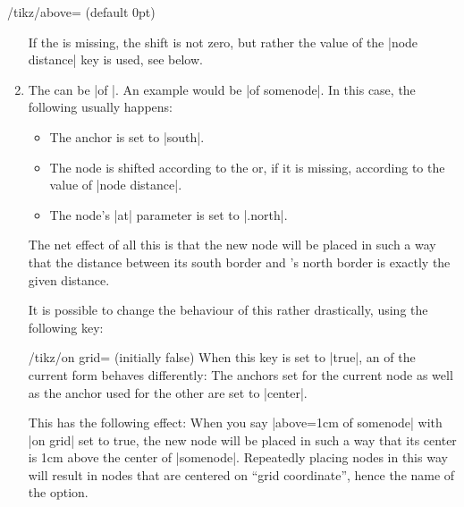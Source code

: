 \begin{key}{/tikz/above= (default 0pt)}
\begin{enumerate}
            If the  is missing, the shift is not zero, but
            rather the value of the |node distance| key is used, see below.
        \item The  can be |of |. An example would
            be |of somenode|. In this case, the following usually happens:
            \begin{itemize}
                \item The anchor is set to |south|.
                \item The node is shifted according to the 
                    or, if it is missing, according to the value of
                    |node distance|.
                \item The node's |at| parameter is set to |.north|.
            \end{itemize}
            The net effect of all this is that the new node will be placed in
            such a way that the distance between its south border and 's north border is exactly the given distance.
\begin{codeexample}[preamble={\usetikzlibrary{positioning}}]
\end{codeexample}
            It is possible to change the behaviour of this 
            rather drastically, using the following key:
            \begin{key}{/tikz/on grid= (initially false)}
                When this key is set to |true|, an  of the
                current form behaves differently: The anchors set for the
                current node as well as the anchor used for the other
                 are set to |center|.

                This has the following effect: When you say
                |above=1cm of somenode| with |on grid| set to true, the new
                node will be placed in such a way that its center is 1cm above
                the center of |somenode|. Repeatedly placing nodes in this way
                will result in nodes that are centered on ``grid coordinate'',
                hence the name of the option.
\begin{codeexample}[preamble={\usetikzlibrary{positioning}}]
\end{codeexample}
\end{key}
\end{enumerate}
\end{key}
